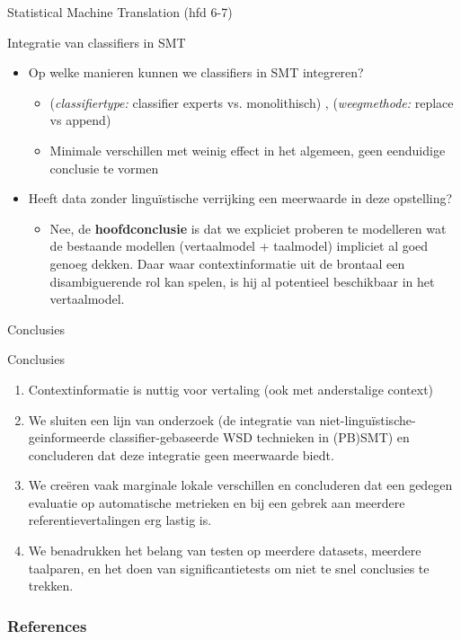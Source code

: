 \documentclass[8pt]{beamer}
\begin{document}
\begin{frame}{Statistical Machine Translation (hfd 6-7)}
    \begin{block}{Integratie van classifiers in SMT}
        \begin{itemize}
            \item Op welke manieren kunnen we classifiers in SMT integreren?
            \begin{itemize}
                \item \color{teal} \footnotesize{(\emph{classifiertype:} classifier experts vs. monolithisch) , (\emph{weegmethode:} replace vs append)}
                \item Minimale verschillen met weinig effect in het algemeen, geen eenduidige conclusie te vormen
            \end{itemize}
            \item Heeft data zonder linguïstische verrijking een meerwaarde in deze opstelling?
            \begin{itemize}
                \item Nee, \color{teal} de \textbf{hoofdconclusie} is dat we expliciet proberen te modelleren wat de bestaande modellen
                    (vertaalmodel + taalmodel) impliciet al goed genoeg dekken. Daar waar contextinformatie uit de
                    brontaal een disambiguerende rol kan spelen, is hij al potentieel beschikbaar in het vertaalmodel.
           \end{itemize}
        \end{itemize}
    \end{block}
\end{frame}

\begin{frame}{Conclusies}
    \begin{block}{Conclusies}
        \begin{enumerate}
            \item Contextinformatie is nuttig voor vertaling (ook met anderstalige context)
            \item We sluiten een lijn van onderzoek
                \citep{Stroppa+07,Rejwanul+11}
                {\color{teal} \footnotesize (de integratie van niet-linguïstische-geinformeerde
                classifier-gebaseerde WSD technieken in (PB)SMT)}
                en concluderen dat deze integratie geen meerwaarde
                biedt.
            \item \color{teal} We creëren vaak marginale lokale verschillen en concluderen dat een gedegen evaluatie op automatische
                metrieken en bij een gebrek aan meerdere referentievertalingen erg lastig is.
            \item \color{teal} We benadrukken het belang van testen op meerdere datasets, meerdere taalparen, en het doen van
                significantietests om niet te snel conclusies te trekken.
        \end{enumerate}
    \end{block}
\end{frame}

\begin{frame}[allowframebreaks]
        \frametitle{References}
        
        
\end{frame}
\end{document}
